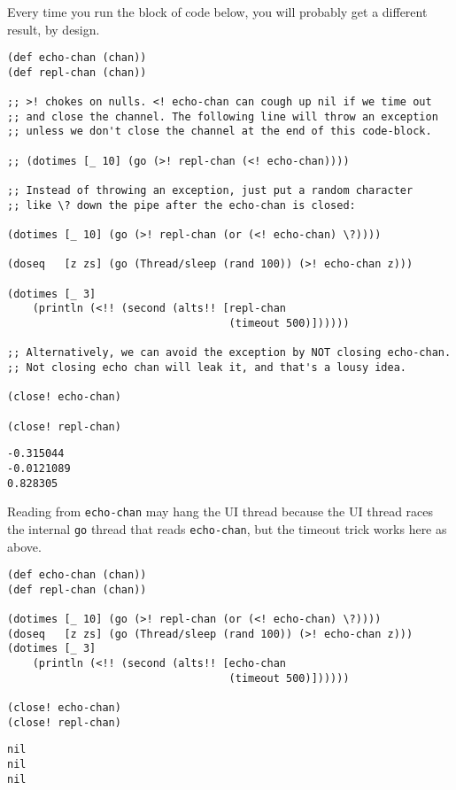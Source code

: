 \documentclass[10pt,oneside,x11names]{article}
\begin{document}
Every time you run the block of code below, you will probably get a different
result, by design.

\begin{verbatim}
(def echo-chan (chan))
(def repl-chan (chan))

;; >! chokes on nulls. <! echo-chan can cough up nil if we time out
;; and close the channel. The following line will throw an exception
;; unless we don't close the channel at the end of this code-block.

;; (dotimes [_ 10] (go (>! repl-chan (<! echo-chan))))

;; Instead of throwing an exception, just put a random character
;; like \? down the pipe after the echo-chan is closed:

(dotimes [_ 10] (go (>! repl-chan (or (<! echo-chan) \?))))

(doseq   [z zs] (go (Thread/sleep (rand 100)) (>! echo-chan z)))

(dotimes [_ 3]
    (println (<!! (second (alts!! [repl-chan
                                   (timeout 500)])))))

;; Alternatively, we can avoid the exception by NOT closing echo-chan.
;; Not closing echo chan will leak it, and that's a lousy idea.

(close! echo-chan)

(close! repl-chan)
\end{verbatim}

\begin{verbatim}
-0.315044
-0.0121089
0.828305
\end{verbatim}


Reading from \texttt{echo-chan} may hang the UI thread because the UI thread
races the internal \texttt{go} thread that reads \texttt{echo-chan}, but the timeout trick
works here as above.

\begin{verbatim}
(def echo-chan (chan))
(def repl-chan (chan))

(dotimes [_ 10] (go (>! repl-chan (or (<! echo-chan) \?))))
(doseq   [z zs] (go (Thread/sleep (rand 100)) (>! echo-chan z)))
(dotimes [_ 3]
    (println (<!! (second (alts!! [echo-chan
                                   (timeout 500)])))))

(close! echo-chan)
(close! repl-chan)
\end{verbatim}

\begin{verbatim}
nil
nil
nil
\end{verbatim}
\end{document}
